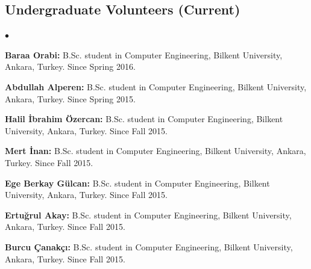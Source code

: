 \documentclass[margin,line]{res}
\newenvironment{list2}{
  \begin{list}{$\bullet$}{%
      \setlength{\itemsep}{0in}
      \setlength{\parsep}{0in} \setlength{\parskip}{0in}
      \setlength{\topsep}{0in} \setlength{\partopsep}{0in} 
      \setlength{\leftmargin}{0.2in}}}{\end{list}}
\begin{document}
\begin{resume}
  \vspace*{-.6cm}
  \subsection{\small \sc Undergraduate Volunteers (Current)}
  \begin{list2}
    \item 
      {\bf Baraa Orabi:} B.Sc. student in Computer Engineering,  Bilkent University, Ankara, Turkey. Since Spring 2016. 
    \item 
      {\bf Abdullah Alperen:} B.Sc. student in Computer Engineering,  Bilkent University, Ankara, Turkey. Since Spring 2015. 
    \item 
      {\bf Halil İbrahim Özercan:} B.Sc. student in Computer Engineering,  Bilkent University, Ankara, Turkey. Since Fall 2015. 
    \item 
      {\bf Mert İnan:} B.Sc. student in Computer Engineering,  Bilkent University, Ankara, Turkey. Since Fall 2015. 
    \item 
      {\bf Ege Berkay Gülcan:} B.Sc. student in Computer Engineering,  Bilkent University, Ankara, Turkey. Since Fall 2015. 
    \item 
      {\bf Ertuğrul Akay:} B.Sc. student in Computer Engineering,  Bilkent University, Ankara, Turkey. Since Fall 2015. 
    \item
      {\bf Burcu Çanakçı:} B.Sc. student in Computer Engineering,  Bilkent University, Ankara, Turkey. Since Fall 2015. 
  \end{list2}

\vspace*{-.6cm}

\end{resume}
\end{document}
